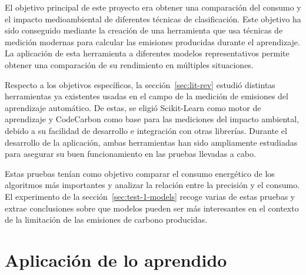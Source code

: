 El objetivo principal de este proyecto era obtener una comparación del consumo y el impacto medioambiental de diferentes técnicas de clasificación. Este objetivo ha sido conseguido mediante la creación de una herramienta que usa técnicas de medición modernas para calcular las emisiones producidas durante el aprendizaje. La aplicación de esta herramienta a diferentes modelos representativos permite obtener una comparación de su rendimiento en múltiples situaciones.

Respecto a los objetivos específicos, la sección~\ref{sec:lit-rev} estudió distintas herramientas ya existentes usadas en el campo de la medición de emisiones del aprendizaje automático. De estas, se eligió Scikit-Learn como motor de aprendizaje y CodeCarbon como base para las mediciones del impacto ambiental, debido a su facilidad de desarrollo e integración con otras librerías. Durante el desarrollo de la aplicación, ambas herramientas han sido ampliamente estudiadas para asegurar su buen funcionamiento en las pruebas llevadas a cabo.

Estas pruebas tenían como objetivo comparar el consumo energético de los algoritmos más importantes y analizar la relación entre la precisión y el consumo. El experimento de la sección~\ref{sec:test-1-models} recoge varias de estas pruebas y extrae conclusiones sobre que modelos pueden ser más interesantes en el contexto de la limitación de las emisiones de carbono producidas.

\section{Aplicación de lo aprendido}
\label{sec:aplicacion}

